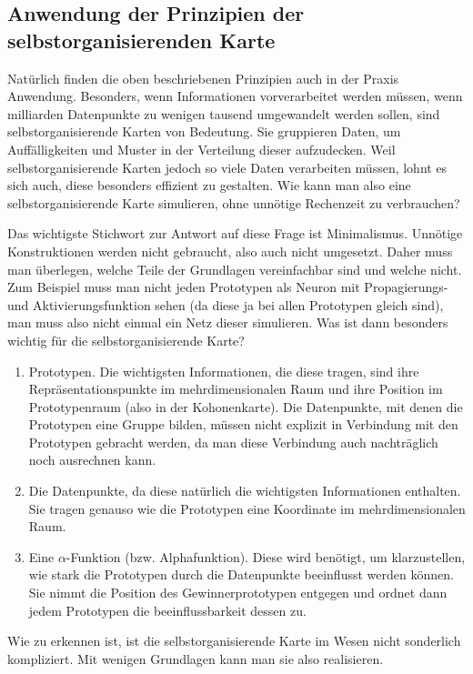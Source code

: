 \documentclass[twoside,a4paper,draft]{article}
\begin{document}
\begin{multicols}{2}
\section{Anwendung der Prinzipien der selbstorganisierenden Karte}

Natürlich finden die oben beschriebenen Prinzipien auch in der Praxis Anwendung. Besonders, wenn Informationen vorverarbeitet werden müssen, wenn milliarden Datenpunkte zu wenigen tausend umgewandelt werden sollen, sind selbstorganisierende Karten von Bedeutung. Sie gruppieren Daten, um Auffälligkeiten und Muster in der Verteilung dieser aufzudecken. Weil selbstorganisierende Karten jedoch so viele Daten verarbeiten müssen, lohnt es sich auch, diese besonders effizient zu gestalten. Wie kann man also eine selbstorganisierende Karte simulieren, ohne unnötige Rechenzeit zu verbrauchen?

Das wichtigste Stichwort zur Antwort auf diese Frage ist Minimalismus. Unnötige Konstruktionen werden nicht gebraucht, also auch nicht umgesetzt. Daher muss man überlegen, welche Teile der Grundlagen vereinfachbar sind und welche nicht. Zum Beispiel muss man nicht jeden Prototypen als Neuron mit Propagierungs- und Aktivierungsfunktion sehen (da diese ja bei allen Prototypen gleich sind), man muss also nicht einmal ein Netz dieser simulieren. Was ist dann besonders wichtig für die selbstorganisierende Karte?

\begin{enumerate}
\item Prototypen. Die wichtigsten Informationen, die diese tragen, sind ihre Repräsentationspunkte im mehrdimensionalen Raum und ihre Position im Prototypenraum (also in der Kohonenkarte). Die Datenpunkte, mit denen die Prototypen eine Gruppe bilden, müssen nicht explizit in Verbindung mit den Prototypen gebracht werden, da man diese Verbindung auch nachträglich noch ausrechnen kann.
\item Die Datenpunkte, da diese natürlich die wichtigsten Informationen enthalten. Sie tragen genauso wie die Prototypen eine Koordinate im mehrdimensionalen Raum.
\item Eine \(\alpha\)-Funktion (bzw. Alphafunktion). Diese wird benötigt, um klarzustellen, wie stark die Prototypen durch die Datenpunkte beeinflusst werden können. Sie nimmt die Position des Gewinnerprototypen entgegen und ordnet dann jedem Prototypen die beeinflussbarkeit dessen zu.
\end{enumerate}

Wie zu erkennen ist, ist die selbstorganisierende Karte im Wesen nicht sonderlich kompliziert. Mit wenigen Grundlagen kann man sie also realisieren.


\end{multicols}
\end{document}
